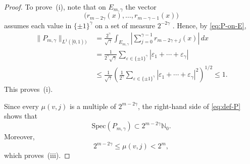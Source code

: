 \documentclass[10pt,a4paper]{amsart}
\begin{document}
\begin{proof}
To prove~(i), note that on $E_{m,\gamma}$ the vector 
\begin{equation*}
\bigl(r_{m-2\gamma}(x),\dots,r_{m-\gamma-1}(x)\bigr)
\end{equation*}
assumes each value in $\{\pm1\}^{\gamma}$ on a set of measure $2^{-2\gamma}$%
. Hence, by \eqref{eq:P-on-E}, 
\begin{align*}
\|P_{m,\gamma}\|_{L^{1}([0,1))} &=\frac{2^{\gamma}}{\sqrt{\gamma}}%
\int_{E_{m,\gamma}} \left|\sum_{j=0}^{\gamma-1} r_{m-2\gamma+j}(x)\right|\,dx
\\
&=\frac{1}{2^{\gamma}\sqrt{\gamma}}\sum_{\varepsilon\in\{\pm1\}^{\gamma}}
|\varepsilon_1+\cdots+\varepsilon_{\gamma}| \\
&\le \frac{1}{\sqrt{\gamma}}\left(\frac{1}{2^{\gamma}}\sum_{\varepsilon\in\{%
\pm1\}^{\gamma}} |\varepsilon_1+\cdots+\varepsilon_{\gamma}|^2\right)^{1/2}
\le 1.
\end{align*}
This proves~(i).

Since every $\mu(v,j)$ is a multiple of $2^{m-2\gamma}$, the right-hand side
of \eqref{eq:def-P} shows that 
\begin{equation*}
\mathrm{Spec}(P_{m,\gamma})\subset 2^{m-2\gamma}\mathbb{N}_0.
\end{equation*}
Moreover, 
\begin{equation*}
2^{m-2\gamma}\le \mu(v,j)<2^m,
\end{equation*}
which proves~(iii).


\end{proof}
\end{document}
